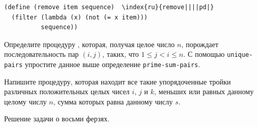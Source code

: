 \begin{Verbatim}[fontsize=\small]
(define (remove item sequence)  \index{ru}{remove||||pd|}
  (filter (lambda (x) (not (= x item)))
          sequence))
\end{Verbatim}

\begin{exercise}{2.40}\label{EX2.40}%
Определите процедуру ,
которая, получая целое число $n$, порождает
последовательность пар $(i, j)$, таких, что $1 \le j
< i \le n$.  С помощью {\tt unique-pairs} упростите
данное выше определение {\tt prime-sum-pairs}.
\end{exercise}

\begin{exercise}{2.41}\label{EX2.41}%
Напишите процедуру, которая находит все такие упорядоченные
тройки различных положительных целых чисел $i$, $j$ и
$k$, меньших или равных данному целому числу
$n$, сумма которых равна данному числу $s$.
\end{exercise}

\begin{cntrfig}

\caption{Решение задачи о восьми ферзях.}
\label{P2.8}
\end{cntrfig}


